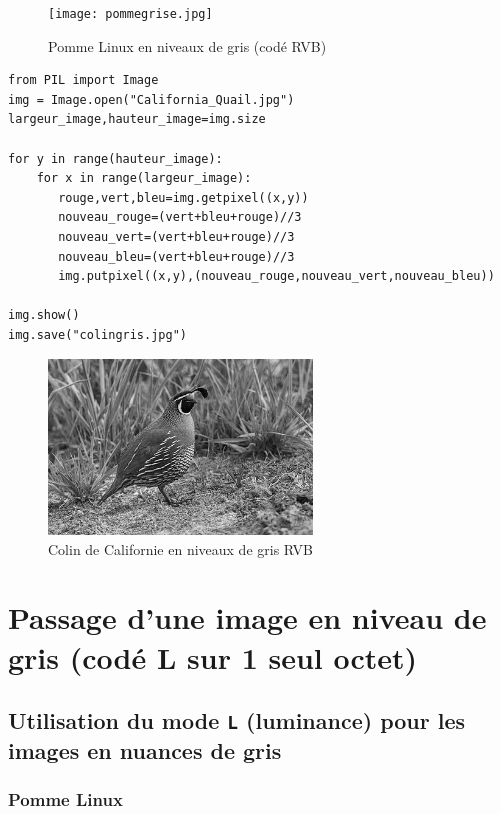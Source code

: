 \documentclass[11pt]{article}
\begin{document}
\begin{figure}[htbp]
\centering
\texttt{[image: pommegrise.jpg]}
\caption{Pomme Linux en niveaux de gris (codé RVB)}
\end{figure}



\begin{verbatim}
from PIL import Image
img = Image.open("California_Quail.jpg")
largeur_image,hauteur_image=img.size

for y in range(hauteur_image):
    for x in range(largeur_image):
       rouge,vert,bleu=img.getpixel((x,y))
       nouveau_rouge=(vert+bleu+rouge)//3
       nouveau_vert=(vert+bleu+rouge)//3
       nouveau_bleu=(vert+bleu+rouge)//3
       img.putpixel((x,y),(nouveau_rouge,nouveau_vert,nouveau_bleu))

img.show()
img.save("colingris.jpg")
\end{verbatim}

\begin{figure}[htbp]
\centering
\includegraphics[width=7cm]{colingris.jpg}
\caption{Colin de Californie en niveaux de gris RVB}
\end{figure}

\section{Passage d'une image en niveau de gris (codé L sur 1 seul octet)}
\label{sec:org744758e}


\subsection{Utilisation du mode \texttt{L} (luminance) pour les images en nuances de gris}
\label{sec:orga57f61d}

\subsubsection{Pomme Linux}
\label{sec:orgc1ddfd9}
\end{document}
